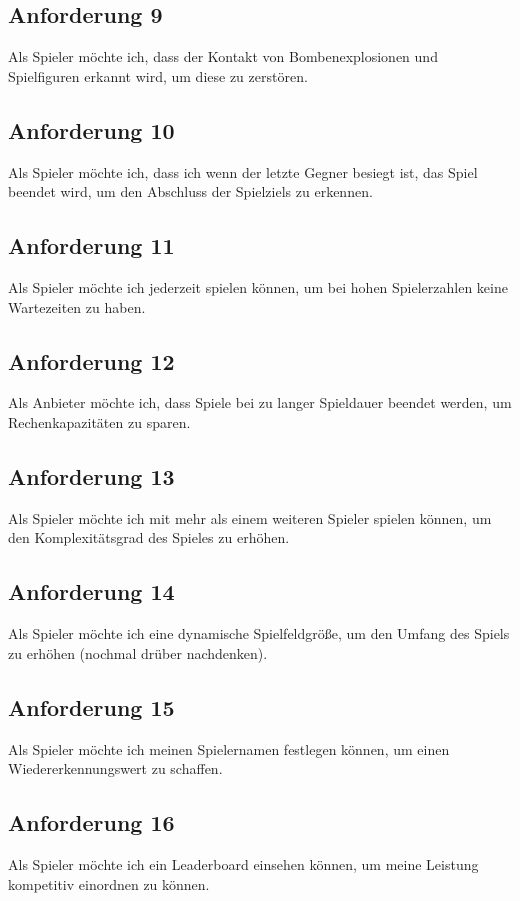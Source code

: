 \documentclass[conference]{IEEEtran}
\begin{document}
\subsection{Anforderung 9}
Als Spieler möchte ich, dass der Kontakt von Bombenexplosionen und Spielfiguren erkannt wird, um diese zu zerstören.

\subsection{Anforderung 10}
Als Spieler möchte ich, dass ich wenn der letzte Gegner besiegt ist, das Spiel beendet wird, um den Abschluss der Spielziels zu erkennen.

\subsection{Anforderung 11}
Als Spieler möchte ich jederzeit spielen können, um bei hohen Spielerzahlen keine Wartezeiten zu haben.

\subsection{Anforderung 12} 
Als Anbieter möchte ich, dass Spiele bei zu langer Spieldauer beendet werden, um Rechenkapazitäten zu sparen.

\subsection{Anforderung 13}
Als Spieler möchte ich mit mehr als einem weiteren Spieler spielen können, um den Komplexitätsgrad des Spieles zu erhöhen.

\subsection{Anforderung 14}
Als Spieler möchte ich eine dynamische Spielfeldgröße, um den Umfang des Spiels zu erhöhen (nochmal drüber nachdenken).

\subsection{Anforderung 15}
Als Spieler möchte ich meinen Spielernamen festlegen können, um einen Wiedererkennungswert zu schaffen.

\subsection{Anforderung 16}
Als Spieler möchte ich ein Leaderboard einsehen können, um meine Leistung kompetitiv einordnen zu können.
\end{document}
